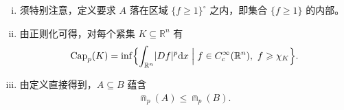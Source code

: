 \documentclass[../../main.tex]{subfiles}%
\begin{document}
\begin{remark}\label{remark:ch04-def-4-10-性质}
\begin{enumerate}[(i)]
\item 须特别注意，定义要求 $A$ 落在区域 $\{f\geqslant1\}^{\circ}$ 之内，即集合 $\{f\geqslant1\}$ 的内部。
\item 由正则化可得，对每个紧集 $K\subseteq\mathbb{R}^n$ 有
\begin{align*}
\operatorname{Cap}_p(K)=\inf\Bigl\{\int_{\mathbb{R}^n}\lvert Df\rvert^p\mathrm{d} x\Bigm|f\in C_c^{\infty}(\mathbb{R}^n),\ f\geqslant\chi_K\Bigr\}.
\end{align*}
\item 由定义直接得到，$A\subseteq B$ 蕴含
\begin{align*}
\Cap_p(A)\leqslant\Cap_p(B).
\end{align*}
\end{enumerate}
\end{remark}
\end{document}
